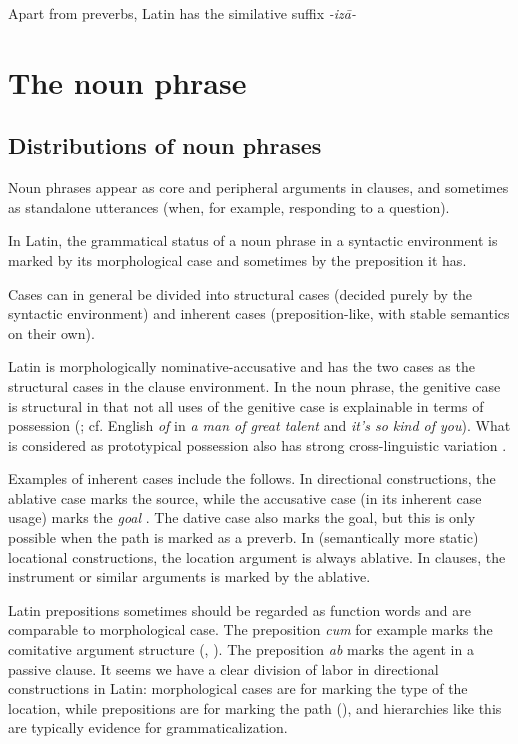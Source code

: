 \documentclass[a4paper, oneside, 12pt]{report}
\newcommand*{\citepage}[1]{p.~{#1}}
\newcommand*{\citepages}[1]{pp.~{#1}}
\newcommand*{\term}[1]{\emph{#1}}
\newcommand{\form}[1]{\emph{#1}}
\begin{document}
Apart from preverbs, Latin has the similative suffix \form{-izā-}

\section{The noun phrase}\label{sec:grammatical.np}

\subsection{Distributions of noun phrases}\label{sec:grammatical.np.case}

Noun phrases appear as core and peripheral arguments in clauses,
and sometimes as standalone utterances (when, for example, responding to a question).

In Latin, the grammatical status of a noun phrase in a syntactic environment is marked by its morphological case and sometimes by the preposition it has. 

Cases can in general be divided into structural cases (decided purely by the syntactic environment) and inherent cases (preposition-like, with stable semantics on their own).

Latin is morphologically nominative-accusative and has the two cases as the structural cases in the clause environment.
In the noun phrase, the genitive case is structural in that 
not all uses of the genitive case is explainable in terms of possession (\citealt[\citepage{244}]{oniga2014latin}; cf. English \form{of}
in \form{a man of great talent} and \form{it's so kind of you}).
What is considered as prototypical possession 
also has strong cross-linguistic variation 
\citep[\citepages{262-263}]{dixon2010basic2}.

Examples of inherent cases include the follows. 
In directional constructions, the ablative case marks the source,
while the accusative case (in its inherent case usage) marks the \term{goal}  \citep[\citepage{238}]{oniga2014latin}.
The dative case also marks the goal,
but this is only possible when the path is marked as a preverb.
In (semantically more static) locational constructions,
the location argument is always ablative.
In clauses, the instrument or similar arguments is marked by the ablative.

Latin prepositions sometimes should be regarded as function words and are comparable to morphological case.
The preposition \form{cum} for example marks the comitative argument structure
(,
).
The preposition \form{ab} marks the agent in a passive clause.
It seems we have a clear division of labor in directional constructions in Latin:
morphological cases are for marking the type of the location,
while prepositions are for marking the path
(),
and hierarchies like this are typically evidence for grammaticalization.
\end{document}
